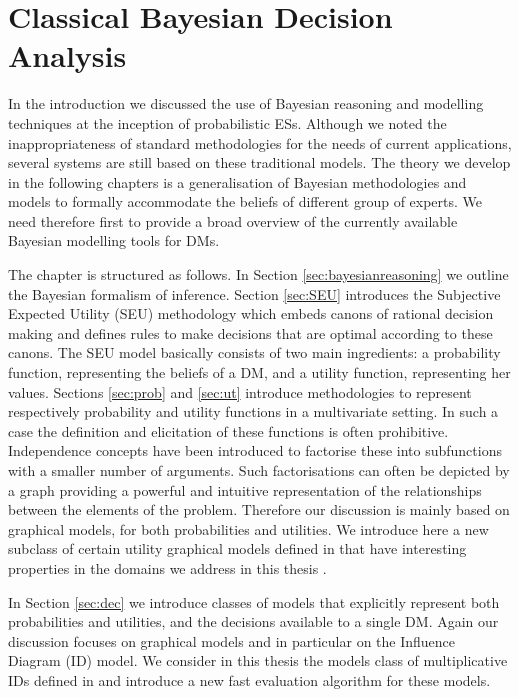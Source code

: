 \chapter{Classical Bayesian Decision Analysis} %

\label{chapter2} %


In the introduction we discussed the use of Bayesian reasoning and modelling techniques at the inception of probabilistic ESs. Although we noted the inappropriateness of standard methodologies for the needs of current applications, several systems are still based on these traditional models. The theory we develop in the following chapters is a generalisation of Bayesian methodologies and models to formally accommodate the beliefs of different group of experts. We need therefore first to provide a broad overview of the currently available Bayesian modelling tools for DMs. 

The chapter is structured as follows. In Section \ref{sec:bayesianreasoning} we outline the Bayesian formalism of inference. Section \ref{sec:SEU} introduces the Subjective Expected Utility (SEU) methodology which embeds canons of rational decision making and defines rules to make decisions that are optimal according to these canons. The SEU model basically consists of two main ingredients: a probability function, representing the beliefs of a DM, and a utility function, representing her values. Sections \ref{sec:prob} and  \ref{sec:ut} introduce methodologies to represent respectively probability and utility functions in a multivariate setting. In such a case the definition and elicitation of these functions is often prohibitive. Independence concepts have been introduced to factorise these into subfunctions with a smaller number of arguments. Such factorisations can  often be depicted by a graph providing a powerful and intuitive representation of the relationships between the elements of the problem. Therefore our discussion is mainly based on graphical models, for both probabilities and utilities. We introduce here a new subclass of certain utility graphical models defined in \citet{Abbas2010} that have interesting properties in the domains we address in this thesis \citep[see also][]{Leonelli2015}.

In Section \ref{sec:dec} we introduce classes of models that explicitly represent both probabilities and utilities, and the decisions available to a single DM. Again our discussion focuses on graphical models and in particular on the Influence Diagram (ID) model. We consider in this thesis the models class of multiplicative IDs defined in \citet{Leonelli2015a} and introduce a new fast evaluation algorithm for these models.

